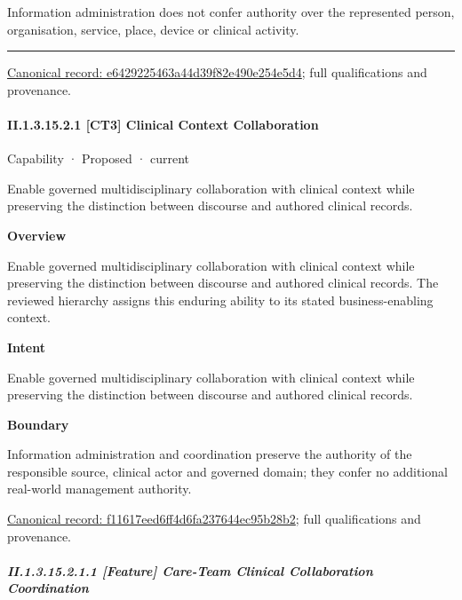Information administration does not confer authority over the represented person, organisation, service, place, device or clinical activity.



\medskip\hrule\medskip

{\footnotesize \href{../../../../continuum/strategy/capability/e6429225463a44d39f82e490e254e5d4.md}{Canonical record: e6429225463a44d39f82e490e254e5d4}; full qualifications and provenance.}\par
\paragraph*{II.1.3.15.2.1 [CT3] Clinical Context Collaboration}
\label{navigation:II.1.3.15.2.1}

\label{element:f11617eed6ff4d6fa237644ec95b28b2}
{\small Capability · Proposed · current}\par

Enable governed multidisciplinary collaboration with clinical context while preserving the distinction between discourse and authored clinical records.



\textbf{Overview}



Enable governed multidisciplinary collaboration with clinical context while preserving the distinction between discourse and authored clinical records. The reviewed hierarchy assigns this enduring ability to its stated business-enabling context.



\textbf{Intent}



Enable governed multidisciplinary collaboration with clinical context while preserving the distinction between discourse and authored clinical records.



\textbf{Boundary}



Information administration and coordination preserve the authority of the responsible source, clinical actor and governed domain; they confer no additional real-world management authority.


{\footnotesize \href{../../../../continuum/strategy/capability/f11617eed6ff4d6fa237644ec95b28b2.md}{Canonical record: f11617eed6ff4d6fa237644ec95b28b2}; full qualifications and provenance.}\par
\subparagraph*{II.1.3.15.2.1.1 [Feature] Care-Team Clinical Collaboration Coordination}
\label{navigation:II.1.3.15.2.1.1}

